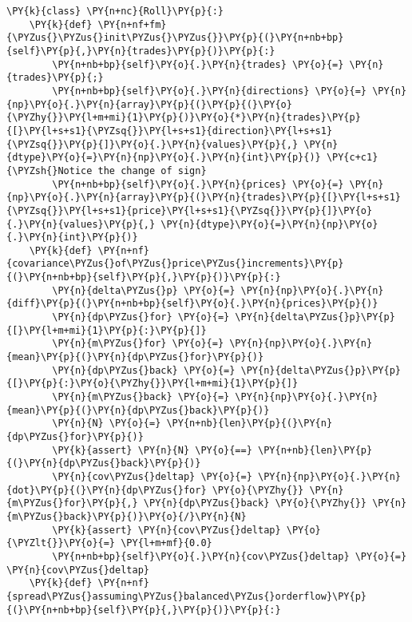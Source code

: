 \documentclass[11pt]{article}
\begin{document}
    \begin{tcolorbox}[breakable, size=fbox, boxrule=1pt, pad at break*=1mm,colback=cellbackground, colframe=cellborder]
\begin{Verbatim}[commandchars=\\\{\}]
\PY{k}{class} \PY{n+nc}{Roll}\PY{p}{:}
    \PY{k}{def} \PY{n+nf+fm}{\PYZus{}\PYZus{}init\PYZus{}\PYZus{}}\PY{p}{(}\PY{n+nb+bp}{self}\PY{p}{,}\PY{n}{trades}\PY{p}{)}\PY{p}{:}
        \PY{n+nb+bp}{self}\PY{o}{.}\PY{n}{trades} \PY{o}{=} \PY{n}{trades}\PY{p}{;}
        \PY{n+nb+bp}{self}\PY{o}{.}\PY{n}{directions} \PY{o}{=} \PY{n}{np}\PY{o}{.}\PY{n}{array}\PY{p}{(}\PY{p}{(}\PY{o}{\PYZhy{}}\PY{l+m+mi}{1}\PY{p}{)}\PY{o}{*}\PY{n}{trades}\PY{p}{[}\PY{l+s+s1}{\PYZsq{}}\PY{l+s+s1}{direction}\PY{l+s+s1}{\PYZsq{}}\PY{p}{]}\PY{o}{.}\PY{n}{values}\PY{p}{,} \PY{n}{dtype}\PY{o}{=}\PY{n}{np}\PY{o}{.}\PY{n}{int}\PY{p}{)} \PY{c+c1}{\PYZsh{}Notice the change of sign}
        \PY{n+nb+bp}{self}\PY{o}{.}\PY{n}{prices} \PY{o}{=} \PY{n}{np}\PY{o}{.}\PY{n}{array}\PY{p}{(}\PY{n}{trades}\PY{p}{[}\PY{l+s+s1}{\PYZsq{}}\PY{l+s+s1}{price}\PY{l+s+s1}{\PYZsq{}}\PY{p}{]}\PY{o}{.}\PY{n}{values}\PY{p}{,} \PY{n}{dtype}\PY{o}{=}\PY{n}{np}\PY{o}{.}\PY{n}{int}\PY{p}{)}
    \PY{k}{def} \PY{n+nf}{covariance\PYZus{}of\PYZus{}price\PYZus{}increments}\PY{p}{(}\PY{n+nb+bp}{self}\PY{p}{,}\PY{p}{)}\PY{p}{:}
        \PY{n}{delta\PYZus{}p} \PY{o}{=} \PY{n}{np}\PY{o}{.}\PY{n}{diff}\PY{p}{(}\PY{n+nb+bp}{self}\PY{o}{.}\PY{n}{prices}\PY{p}{)}
        \PY{n}{dp\PYZus{}for} \PY{o}{=} \PY{n}{delta\PYZus{}p}\PY{p}{[}\PY{l+m+mi}{1}\PY{p}{:}\PY{p}{]}
        \PY{n}{m\PYZus{}for} \PY{o}{=} \PY{n}{np}\PY{o}{.}\PY{n}{mean}\PY{p}{(}\PY{n}{dp\PYZus{}for}\PY{p}{)}
        \PY{n}{dp\PYZus{}back} \PY{o}{=} \PY{n}{delta\PYZus{}p}\PY{p}{[}\PY{p}{:}\PY{o}{\PYZhy{}}\PY{l+m+mi}{1}\PY{p}{]}
        \PY{n}{m\PYZus{}back} \PY{o}{=} \PY{n}{np}\PY{o}{.}\PY{n}{mean}\PY{p}{(}\PY{n}{dp\PYZus{}back}\PY{p}{)}
        \PY{n}{N} \PY{o}{=} \PY{n+nb}{len}\PY{p}{(}\PY{n}{dp\PYZus{}for}\PY{p}{)}
        \PY{k}{assert} \PY{n}{N} \PY{o}{==} \PY{n+nb}{len}\PY{p}{(}\PY{n}{dp\PYZus{}back}\PY{p}{)}
        \PY{n}{cov\PYZus{}deltap} \PY{o}{=} \PY{n}{np}\PY{o}{.}\PY{n}{dot}\PY{p}{(}\PY{n}{dp\PYZus{}for} \PY{o}{\PYZhy{}} \PY{n}{m\PYZus{}for}\PY{p}{,} \PY{n}{dp\PYZus{}back} \PY{o}{\PYZhy{}} \PY{n}{m\PYZus{}back}\PY{p}{)}\PY{o}{/}\PY{n}{N}
        \PY{k}{assert} \PY{n}{cov\PYZus{}deltap} \PY{o}{\PYZlt{}}\PY{o}{=} \PY{l+m+mf}{0.0}
        \PY{n+nb+bp}{self}\PY{o}{.}\PY{n}{cov\PYZus{}deltap} \PY{o}{=} \PY{n}{cov\PYZus{}deltap}
    \PY{k}{def} \PY{n+nf}{spread\PYZus{}assuming\PYZus{}balanced\PYZus{}orderflow}\PY{p}{(}\PY{n+nb+bp}{self}\PY{p}{,}\PY{p}{)}\PY{p}{:}

\end{Verbatim}
\end{tcolorbox}
\end{document}

